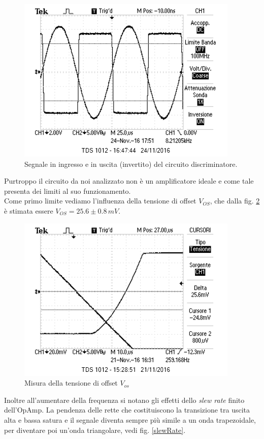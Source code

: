 \documentclass[10pt,a4paper]{article}
\begin{document}
\begin{figure}[htb!]
\centering
\includegraphics[scale=1.0]{immagini/discriminatore.png}
\caption{Segnale in ingresso e in uscita (invertito) del circuito discriminatore.}
\label{funzionaBene}
\end{figure}

Purtroppo il circuito da noi analizzato non è un amplificatore ideale e come tale presenta dei limiti al suo funzionamento.\\
Come primo limite vediamo l'influenza della tensione di offset $V_{OS}$, che dalla fig. \ref{Vos} è stimata essere $V_{OS} = 25.6 \pm 0.8 \, mV$.\\

\begin{figure}[htb!]
\centering
\includegraphics[scale=1.0]{immagini/Vos.png}
\caption{Misura della tensione di offset $V_{os}$}
\label{Vos}
\end{figure}

Inoltre all'aumentare della frequenza si notano gli effetti dello \emph{slew rate} finito dell'OpAmp. La pendenza delle rette che costituiscono la transizione tra uscita alta e bassa satura e il segnale diventa sempre più simile a un onda trapezoidale, per diventare poi un'onda triangolare, vedi fig. \ref{slewRate}.\\
\end{document}
